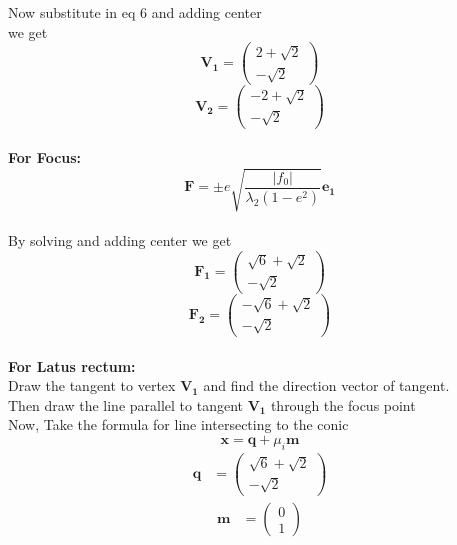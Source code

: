 \documentclass[10pt,a4paper]{report}
\newcommand{\myvec}[1]{\ensuremath{\begin{pmatrix}#1\end{pmatrix}}}
\let\vec\mathbf
\begin{document}
\begin{multicols}{2}
Now substitute in eq 6 and adding center 
\vspace{0.25cm}\\
we get
\vspace{0.25cm}\\
\begin{equation}
\vec{V_1} = \myvec{2+\sqrt{2} \\ -\sqrt{2}}
\end{equation}
\begin{equation}
\vec{V_2} = \myvec{-2+\sqrt{2} \\ -\sqrt{2}}
\end{equation}
\vspace{0.25cm}\\
\textbf{For Focus:}
\vspace{0.25cm}\\
\begin{equation}
\vec{F} = \pm e \sqrt{\frac{|f_0|}{\lambda_2(1-e^2)}} \vec{e_1}
\end{equation}
\vspace{0.25cm}\\
By solving and adding center we get 
\vspace{0.25cm}\\
\begin{equation}
\vec{F_1} = \myvec{\sqrt{6}+\sqrt{2} \\ -\sqrt{2}}
\end{equation}
\begin{equation}
\vec{F_2} = \myvec{-\sqrt{6}+\sqrt{2} \\ -\sqrt{2}}
\end{equation}
\vspace{0.25cm}\\
\textbf{For Latus rectum:}
\vspace{0.25cm}\\
Draw the tangent to vertex $\vec{V_1}$ and find the direction vector of tangent.
\vspace{0.25cm}\\
Then draw the line parallel to tangent  $\vec{V_1}$ through the focus point
\vspace{0.25cm}\\
Now, Take the formula for line intersecting to the conic 
\vspace{0.25cm}\\
\begin{equation}
\vec{x}=\vec{q}+\mu_i\vec{m}
\end{equation}
\begin{align} 
\vec{q} &=  \myvec{\sqrt{6}+\sqrt{2} \\ -\sqrt{2}}
\end{align}
\begin{align} 
\vec{m} &= \myvec{0 \\ 1} 
\end{align}


\end{multicols}
\end{document}
